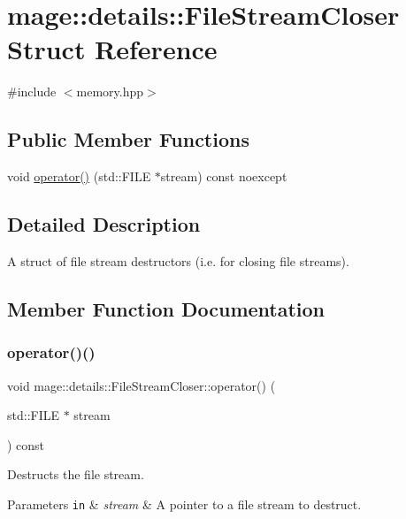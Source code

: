 \hypertarget{structmage_1_1details_1_1_file_stream_closer}{}\section{mage\+:\+:details\+:\+:File\+Stream\+Closer Struct Reference}
\label{structmage_1_1details_1_1_file_stream_closer}


{\ttfamily \#include $<$memory.\+hpp$>$}

\subsection*{Public Member Functions}
\begin{DoxyCompactItemize}
\item 
void \mbox{\hyperlink{structmage_1_1details_1_1_file_stream_closer_a3d322e59dfdf94c94cc0a09388a6dbe7}{operator()}} (std\+::\+F\+I\+LE $\ast$stream) const noexcept
\end{DoxyCompactItemize}


\subsection{Detailed Description}
A struct of file stream destructors (i.\+e. for closing file streams). 

\subsection{Member Function Documentation}
\mbox{\label{structmage_1_1details_1_1_file_stream_closer_a3d322e59dfdf94c94cc0a09388a6dbe7}} 
\subsubsection{\texorpdfstring{operator()()}{operator()()}}
{\footnotesize\ttfamily void mage\+::details\+::\+File\+Stream\+Closer\+::operator() (\begin{DoxyParamCaption}\item[{std\+::\+F\+I\+LE $\ast$}]{stream }\end{DoxyParamCaption}) const\hspace{0.3cm}{\ttfamily [noexcept]}}

Destructs the file stream.


\begin{DoxyParams}[1]{Parameters}
\mbox{\tt in}  & {\em stream} & A pointer to a file stream to destruct. \\
\hline
\end{DoxyParams}

